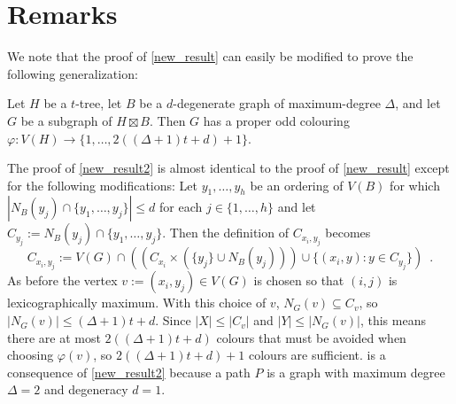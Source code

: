 \documentclass{patmorin}
\begin{document}
\section{Remarks}

We note that the proof of \cref{new_result} can easily be modified to prove the following generalization:

\begin{thm}\label{new_result2}
  Let $H$ be a $t$-tree, let $B$ be a $d$-degenerate graph of maximum-degree $\Delta$, and let $G$ be a subgraph of $H\boxtimes B$. Then $G$ has a proper odd colouring $\varphi:V(H)\to\{1,\ldots,2((\Delta+1)t + d)+1\}$.
\end{thm}

The proof of \cref{new_result2} is almost identical to the proof of \cref{new_result} except for the following modifications:  Let $y_1,\ldots,y_h$ be an ordering of $V(B)$ for which $|N_B(y_j)\cap\{y_1,\ldots,y_{j}\}|\le d$ for each $j\in\{1,\ldots,h\}$ and let $C_{y_j}:=N_B(y_j)\cap\{y_1,\ldots,y_{j}\}$.  Then the definition of $C_{x_i,y_j}$ becomes
\[
   C_{x_i,y_j} := V(G)\cap \left( (C_{x_i}\times (\{y_j\}\cup N_B(y_j)))
       \cup \{(x_i,y): y \in C_{y_j}\}  \right) \enspace .
\]
As before the vertex $v:=(x_i,y_j)\in V(G)$ is chosen so that $(i,j)$ is lexicographically maximum.  With this choice of $v$,  $N_G(v)\subseteq C_v$, so $|N_G(v)|\le (\Delta+1)t+d$. Since $|X|\le |C_v|$ and $|Y|\le |N_G(v)|$, this means there are at most $2((\Delta+1)t+d)$ colours that must be avoided when choosing $\varphi(v)$, so $2((\Delta+1)t+d)+1$ colours are sufficient.  is a consequence of \cref{new_result2} because a path $P$ is a graph with maximum degree $\Delta=2$ and degeneracy $d=1$.

\end{document}
